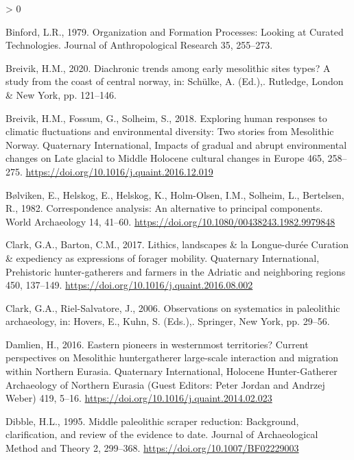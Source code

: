 \documentclass[
]{article}
\newlength{\cslhangindent}
\newenvironment{CSLReferences}[2] %
 {%
  \setlength{\parindent}{0pt}
  \ifodd #1 \everypar{\setlength{\hangindent}{\cslhangindent}}\ignorespaces\fi
  \ifnum #2 > 0
  \setlength{\parskip}{#2\baselineskip}
  \fi
 }%
 {}
\begin{document}
\begin{CSLReferences}{1}{0}
\leavevmode\hypertarget{ref-binford1979}{}%
Binford, L.R., 1979. Organization and Formation Processes: Looking at Curated Technologies. Journal of Anthropological Research 35, 255--273.

\leavevmode\hypertarget{ref-breivik2020}{}%
Breivik, H.M., 2020. Diachronic trends among early mesolithic sites types? A study from the coast of central norway, in: Schülke, A. (Ed.),. Rutledge, London \& New York, pp. 121--146.

\leavevmode\hypertarget{ref-breivik2018}{}%
Breivik, H.M., Fossum, G., Solheim, S., 2018. Exploring human responses to climatic fluctuations and environmental diversity: Two stories from Mesolithic Norway. Quaternary International, Impacts of gradual and abrupt environmental changes on Late glacial to Middle Holocene cultural changes in Europe 465, 258--275. \url{https://doi.org/10.1016/j.quaint.2016.12.019}

\leavevmode\hypertarget{ref-buxf8lviken1982}{}%
Bølviken, E., Helskog, E., Helskog, K., Holm-Olsen, I.M., Solheim, L., Bertelsen, R., 1982. Correspondence analysis: An alternative to principal components. World Archaeology 14, 41--60. \url{https://doi.org/10.1080/00438243.1982.9979848}

\leavevmode\hypertarget{ref-clark2017}{}%
Clark, G.A., Barton, C.M., 2017. Lithics, landscapes \& la Longue-durée {{}} Curation \& expediency as expressions of forager mobility. Quaternary International, Prehistoric hunter-gatherers and farmers in the Adriatic and neighboring regions 450, 137--149. \url{https://doi.org/10.1016/j.quaint.2016.08.002}

\leavevmode\hypertarget{ref-clark2006}{}%
Clark, G.A., Riel-Salvatore, J., 2006. Observations on systematics in paleolithic archaeology, in: Hovers, E., Kuhn, S. (Eds.),. Springer, New York, pp. 29--56.

\leavevmode\hypertarget{ref-damlien2016}{}%
Damlien, H., 2016. Eastern pioneers in westernmost territories? Current perspectives on Mesolithic hunter{{}}gatherer large-scale interaction and migration within Northern Eurasia. Quaternary International, Holocene Hunter-Gatherer Archaeology of Northern Eurasia (Guest Editors: Peter Jordan and Andrzej Weber) 419, 5--16. \url{https://doi.org/10.1016/j.quaint.2014.02.023}

\leavevmode\hypertarget{ref-dibble1995}{}%
Dibble, H.L., 1995. Middle paleolithic scraper reduction: Background, clarification, and review of the evidence to date. Journal of Archaeological Method and Theory 2, 299--368. \url{https://doi.org/10.1007/BF02229003}


\end{CSLReferences}
\end{document}
